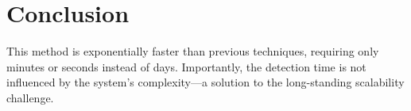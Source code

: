 \section{Conclusion}
This method is exponentially faster than previous techniques, requiring only minutes or seconds instead of days. Importantly, the detection time is not influenced by the system's complexity—a solution to the long-standing scalability challenge.
